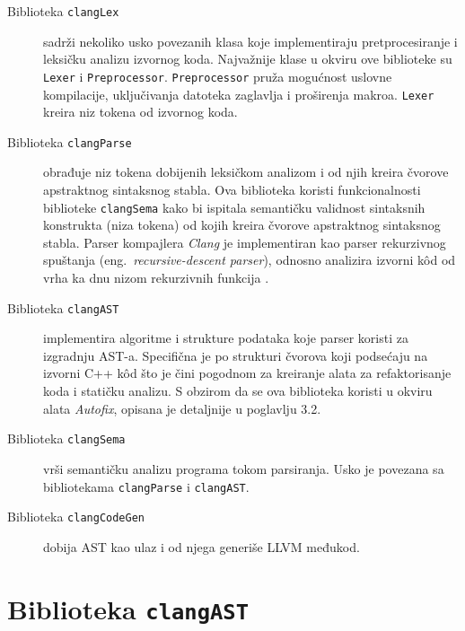 \documentclass[12pt,oneside]{memoir}
\begin{document}
\begin{description}
  \item[Biblioteka \texttt{clangLex}] sadr\v{z}i nekoliko usko povezanih klasa koje implementiraju pretprocesiranje i leksi\v{c}ku analizu izvornog koda. Najva\v{z}nije klase u okviru ove biblioteke
       su \texttt{Lexer} i  \texttt{Preprocessor}.
       \texttt{Preprocessor} pru\v{z}a mogućnost uslovne kompilacije, uključivanja datoteka zaglavlja i proširenja makroa.
       \texttt{Lexer} kreira niz tokena od izvornog koda.
  \item[Biblioteka \texttt{clangParse}]
        obrađuje niz tokena dobijenih leksi\v{c}kom analizom i od njih kreira \v{c}vorove apstraktnog sintaksnog stabla. Ova biblioteka koristi funkcionalnosti 
        biblioteke \texttt{clangSema} kako bi ispitala semanti\v{c}ku validnost sintaksnih konstrukta (niza tokena) od kojih kreira \v{c}vorove apstraktnog sintaksnog stabla.
        Parser kompajlera \textit{Clang} je implementiran kao parser rekurzivnog spuštanja (eng.~\textit{recursive-descent parser}), odnosno analizira izvorni k\^{o}d od vrha ka dnu nizom rekurzivnih funkcija \cite{LLVMCoreLibraries}.
  \item[Biblioteka \texttt{clangAST}]
        implementira algoritme i strukture podataka koje parser koristi za izgradnju AST-a. Specifična je po strukturi čvorova koji podsećaju na izvorni C++ k\^{o}d što je čini pogodnom za kreiranje alata za refaktorisanje koda i statičku analizu. S obzirom da se ova biblioteka koristi u okviru alata \textit{Autofix}, opisana je detaljnije u poglavlju 3.2.
  \item[Biblioteka \texttt{clangSema}]
        vrši semantičku analizu programa tokom parsiranja. Usko je povezana sa bibliotekama \texttt{clangParse} i \texttt{clangAST}.
  \item[Biblioteka \texttt{clangCodeGen}]
        dobija AST kao ulaz i od njega generiše LLVM međukod.
\end{description}


\section{Biblioteka \texttt{clangAST}}
\end{document}
